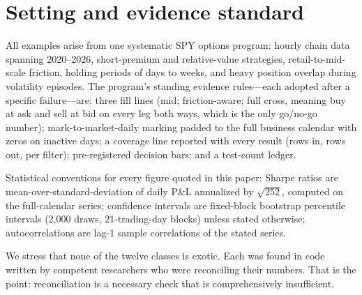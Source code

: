 \documentclass[11pt]{article}
\begin{document}
\section{Setting and evidence standard}
All examples arise from one systematic SPY options program: hourly chain data spanning
2020--2026, short-premium and relative-value strategies, retail-to-mid-scale friction, holding
periods of days to weeks, and heavy position overlap during volatility episodes. The program's
standing evidence rules---each adopted after a specific failure---are: three fill lines (mid;
friction-aware; full cross, meaning buy at ask and sell at bid on every leg both ways, which is
the only go/no-go number); mark-to-market-daily marking padded to the full business calendar
with zeros on inactive days; a coverage line reported with every result (rows in, rows out, per
filter); pre-registered decision bars; and a test-count ledger.

Statistical conventions for every figure quoted in this paper: Sharpe ratios are
mean-over-standard-deviation of daily P\&L annualized by $\sqrt{252}$, computed on the
full-calendar series; confidence intervals are fixed-block bootstrap percentile intervals
\citep{kunsch} (2{,}000 draws, 21-trading-day blocks) unless stated otherwise; autocorrelations
are lag-1 sample correlations of the stated series.

We stress that none of the twelve classes is exotic. Each was found in code written by
competent researchers who were reconciling their numbers. That is the point: reconciliation is
a necessary check that is comprehensively insufficient.
\end{document}
